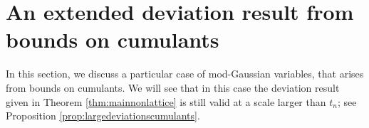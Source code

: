\documentclass[12pt,a4paper,reqno]{amsart}
\theoremstyle{remark}
\begin{document}

























\section{An extended deviation result from bounds on cumulants}\label{sec:cumulantechnic}
In this section, we discuss a particular case of mod-Gaussian variables, that arises from bounds on cumulants. We will see that in this case the deviation result given in Theorem \ref{thm:mainnonlattice} is still valid at a scale larger than $t_n$; see Proposition \ref{prop:largedeviationscumulants}.
\end{document}
